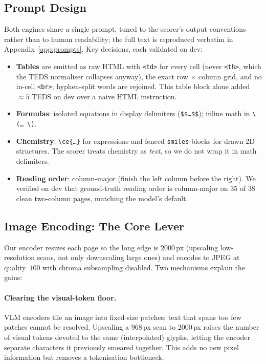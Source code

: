 \documentclass[11pt]{article}
\begin{document}
\subsection{Prompt Design}
\label{sec:prompt}
Both engines share a single prompt, tuned to the scorer's output conventions rather
than to human readability; the full text is reproduced verbatim in
Appendix~\ref{app:prompts}. Key decisions, each validated on dev:
\begin{itemize}[nosep]
  \item \textbf{Tables} are emitted as raw HTML with \texttt{<td>} for every cell
    (never \texttt{<th>}, which the TEDS normaliser collapses anyway), the exact row
    $\times$ column grid, and no in-cell \texttt{<br>}; hyphen-split words are
    rejoined. This table block alone added ${\approx}5$ TEDS on dev over a
    naive HTML instruction.
  \item \textbf{Formulas}: isolated equations in display delimiters
    (\texttt{\$\$\ldots\$\$}); inline math in \texttt{\textbackslash(\ldots
    \textbackslash)}.
  \item \textbf{Chemistry}: \texttt{\textbackslash ce\{\ldots\}} for expressions and
    fenced \texttt{smiles} blocks for drawn 2D structures. The scorer treats
    chemistry as \emph{text}, so we do not wrap it in math delimiters.
  \item \textbf{Reading order}: column-major (finish the left column before the
    right). We verified on dev that ground-truth reading order is column-major on
    $35$ of $38$ clean two-column pages, matching the model's default.
\end{itemize}

\subsection{Image Encoding: The Core Lever}
\label{sec:image}
Our encoder resizes each page so the long edge is $2000$\,px (upscaling low-resolution
scans, not only downscaling large ones) and encodes to JPEG at quality~$100$ with
chroma subsampling disabled. Two mechanisms explain the gains:

\paragraph{Clearing the visual-token floor.} VLM encoders tile an image into
fixed-size patches; text that spans too few patches cannot be resolved. Upscaling a
$968$\,px scan to $2000$\,px raises the number of visual tokens devoted to the same
(interpolated) glyphs, letting the encoder separate characters it previously smeared
together. This adds no new pixel information but removes a tokenisation bottleneck.
\end{document}
